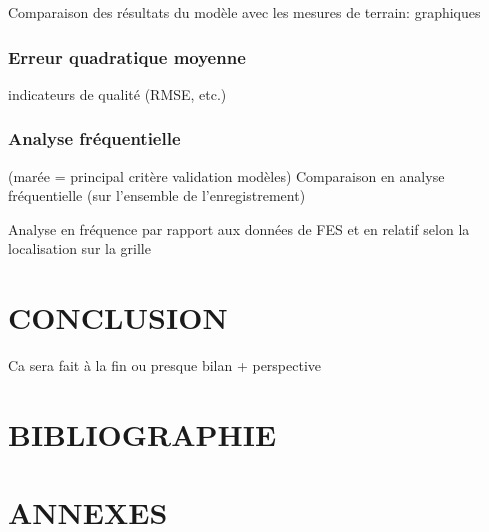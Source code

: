 \documentclass[10pt,a4paper,titlepage]{article}
\begin{document}
Comparaison des résultats du modèle avec les mesures de terrain: graphiques

\subsubsection{Erreur quadratique moyenne}
indicateurs de qualité (RMSE, etc.)

\subsubsection{Analyse fréquentielle}
(marée = principal critère validation modèles)
Comparaison en analyse fréquentielle (sur l'ensemble de l'enregistrement)

Analyse en fréquence par rapport aux données de FES et en relatif selon la localisation sur la grille

\newpage

\section{CONCLUSION}
\label{sec:conclusion}

Ca sera fait à la fin ou presque
bilan + perspective

\newpage
\section{BIBLIOGRAPHIE}
%
%
\printbibliography

\newpage
\section{ANNEXES}
\label{annexes}
\end{document}
